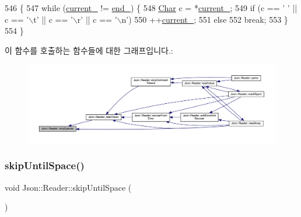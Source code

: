 \begin{DoxyCode}
546                         \{
547   \textcolor{keywordflow}{while} (\hyperlink{class_json_1_1_reader_a2f2feb5201a26da7aa133d2f7434479b}{current\_} != \hyperlink{class_json_1_1_reader_a714793579cbf4ee7c5a7223d2c8d77c1}{end\_}) \{
548     \hyperlink{class_json_1_1_reader_a3eec9118f3e9a672ba8348c3a79d0f45}{Char} c = *\hyperlink{class_json_1_1_reader_a2f2feb5201a26da7aa133d2f7434479b}{current\_};
549     \textcolor{keywordflow}{if} (c == \textcolor{charliteral}{' '} || c == \textcolor{charliteral}{'\(\backslash\)t'} || c == \textcolor{charliteral}{'\(\backslash\)r'} || c == \textcolor{charliteral}{'\(\backslash\)n'})
550       ++\hyperlink{class_json_1_1_reader_a2f2feb5201a26da7aa133d2f7434479b}{current\_};
551     \textcolor{keywordflow}{else}
552       \textcolor{keywordflow}{break};
553   \}
554 \}
\end{DoxyCode}
이 함수를 호출하는 함수들에 대한 그래프입니다.\+:\nopagebreak
\begin{figure}[H]
\begin{center}
\leavevmode
\includegraphics[width=350pt]{class_json_1_1_reader_a40d0f69d15aeb2d52ff78d794f5ab8b2_icgraph}
\end{center}
\end{figure}
\mbox{\label{class_json_1_1_reader_ad922ea5a8ab333084edbb84827861fa3}} 
\subsubsection{\texorpdfstring{skip\+Until\+Space()}{skipUntilSpace()}}
{\footnotesize\ttfamily void Json\+::\+Reader\+::skip\+Until\+Space (\begin{DoxyParamCaption}{ }\end{DoxyParamCaption})\hspace{0.3cm}{\ttfamily [private]}}



